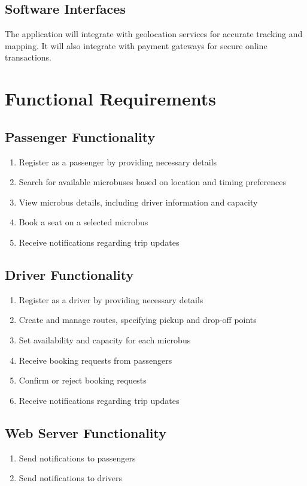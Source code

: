 \documentclass{BusMateSRS}
\begin{document}
\subsection{Software Interfaces}
The application will integrate with geolocation services for accurate tracking
and mapping. It will also integrate with payment gateways for secure online
transactions.

\section{Functional Requirements}
\subsection{Passenger Functionality}
\begin{enumerate}
	\item Register as a passenger by providing necessary details
	\item Search for available microbuses based on location and timing preferences
	\item View microbus details, including driver information and capacity
	\item Book a seat on a selected microbus
	\item Receive notifications regarding trip updates
\end{enumerate}

\subsection{Driver Functionality}
\begin{enumerate}
	\item Register as a driver by providing necessary details
	\item Create and manage routes, specifying pickup and drop-off points
	\item Set availability and capacity for each microbus
	\item Receive booking requests from passengers
	\item Confirm or reject booking requests
	\item Receive notifications regarding trip updates
\end{enumerate}

\subsection{Web Server Functionality}
\begin{enumerate}
	\item Send notifications to passengers
	\item Send notifications to drivers
\end{enumerate}
\end{document}
